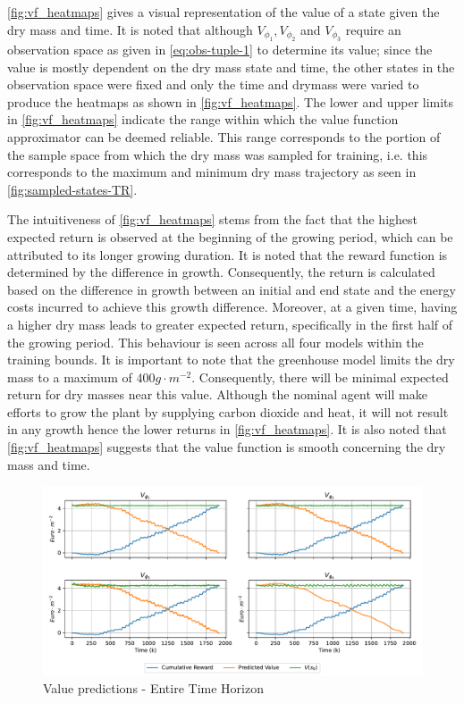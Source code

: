\autoref{fig:vf_heatmaps} gives a visual representation of the value of a state given the dry mass and time. It is noted that although $V_{\phi_1},V_{\phi_2}$ and $V_{\phi_3}$ require an observation space as given in \autoref{eq:obs-tuple-1} to determine its value; since the value is mostly dependent on the dry mass state and time, the other states in the observation space were fixed and only the time and drymass were varied to produce the heatmaps as shown in \autoref{fig:vf_heatmaps}. The lower and upper limits in  \autoref{fig:vf_heatmaps} indicate the range within which the value function approximator can be deemed reliable. This range corresponds to the portion of the sample space from which the dry mass was sampled for training, i.e. this corresponds to the maximum and minimum dry mass trajectory as seen in \autoref{fig:sampled-states-TR}.

The intuitiveness of \autoref{fig:vf_heatmaps} stems from the fact that the highest expected return is observed at the beginning of the growing period, which can be attributed to its longer growing duration. It is noted that the reward function is determined by the difference in growth. Consequently, the return is calculated based on the difference in growth between an initial and end state and the energy costs incurred to achieve this growth difference. Moreover, at a given time, having a higher dry mass leads to greater expected return, specifically in the first half of the growing period. This behaviour is seen across all four models within the training bounds. It is important to note that the greenhouse model limits the dry mass to a maximum of $400 g \cdot m^{-2}$. Consequently, there will be minimal expected return for dry masses near this value. Although the nominal agent will make efforts to grow the plant by supplying carbon dioxide and heat, it will not result in any growth hence the lower returns in \autoref{fig:vf_heatmaps}.  It is also noted that \autoref{fig:vf_heatmaps} suggests that the value function is smooth concerning the dry mass and time.

\begin{figure}[H]
	\centering
	\includegraphics[width = \textwidth]{figures/vf_time_predictions_long.pdf}
	\caption{Value predictions - Entire Time Horizon}
	\label{fig:tr_predictions_long}
\end{figure}

